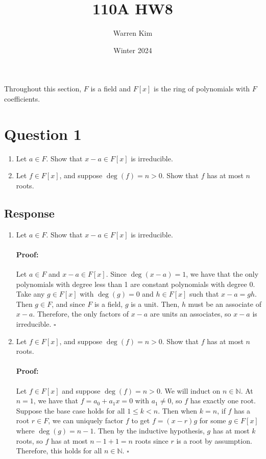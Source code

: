 \documentclass [12pt] {article}
\title{110A HW8}
\author{Warren Kim}
\date{Winter 2024}
\newcommand{\N}{\mathbb{N}}
\newenvironment{proof}{\paragraph{Proof:}}{\hfill$\square$}
\begin{document}
\maketitle

Throughout this section, $F$ is a field and $F[x]$ is the ring of polynomials with $F$ coefficients.

\section*{Question 1}
\begin{enumerate}
    \item Let $a\in F$. Show that $x-a\in F[x]$ is irreducible.
    \item Let $f\in F[x]$, and suppose $\deg(f)=n>0$. Show that $f$ has at most $n$ roots.
\end{enumerate}

\subsection*{Response}
\begin{enumerate}
    \item Let $a\in F$. Show that $x-a\in F[x]$ is irreducible.
        \begin{proof}
            Let $a \in F$ and $x - a \in F[x]$. Since $\deg(x - a) = 1$, we have that the only
            polynomials with degree less than 1 are constant polynomials with degree 0. Take any
            $g \in F[x]$ with $\deg(g) = 0$ and $h \in F[x]$ such that $x - a = gh$. Then $g \in F$,
            and since $F$ is a field, $g$ is a unit. Then, $h$ must be an associate of $x - a$.
            Therefore, the only factors of $x - a$ are units an associates, so $x - a$ is
            irreducible.
        \end{proof}
    \item Let $f\in F[x]$, and suppose $\deg(f)=n>0$. Show that $f$ has at most $n$ roots.
        \begin{proof}
            Let $f \in F[x]$ and suppose $\deg(f) = n > 0$. We will induct on
            $n \in \N$. At $n = 1$, we have that $f = a_0 + a_1x = 0$ with $a_1 \neq 0$, so
            $f$ has exactly one root. Suppose the base case holds for all $1 \leq k < n$. Then when
            $k = n$, if $f$ has a root $r \in F$, we can uniquely factor $f$ to get
            $f = (x - r)g$ for some $g \in F[x]$ where $\deg(g) = n - 1$. Then
            by the inductive hypothesis, $g$ has at most $k$ roots, so $f$ has at most
            $n - 1 + 1 = n$ roots since $r$ is a root by assumption. Therefore, this holds for all
            $n \in \N$.
        \end{proof}
\end{enumerate}
\newpage
\end{document}
